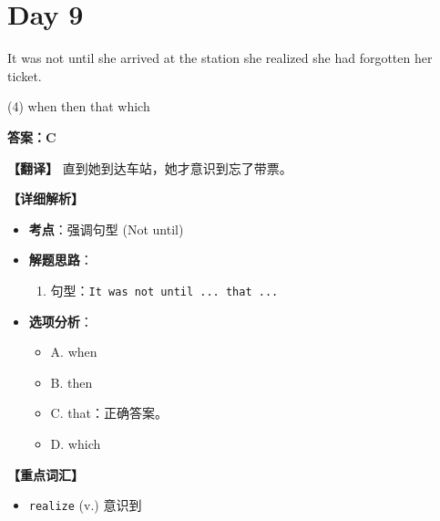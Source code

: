 \documentclass[11pt, a4paper]{article}
\newcommand{\analysis}[4]{
    \begin{solutionbox}
        \textbf{答案：#1}
        
        \textbf{【翻译】} #2
        
        \textbf{【详细解析】}
        #3
        
        \textbf{【重点词汇】}
        #4
    \end{solutionbox}
}
\newcommand{\blank}{\underline{\hspace{1.5cm}}}
\begin{document}
\section*{Day 9}
\begin{questions}
    \item It was not until she arrived at the station \blank she realized she had forgotten her ticket.
    \begin{tasks}(4)
        \task when \task then \task that \task which
    \end{tasks}
    \analysis{C}{直到她到达车站，她才意识到忘了带票。}{
        \begin{itemize}
            \item \textbf{考点}：强调句型 (Not until)
            \item \textbf{解题思路}：
                \begin{enumerate}
                    \item 句型：\texttt{It was not until ... that ...}
                \end{enumerate}
            \item \textbf{选项分析}：
                \begin{itemize}
                    \item A. when
                    \item B. then
                    \item C. that：正确答案。
                    \item D. which
                \end{itemize}
        \end{itemize}
    }{
        \begin{itemize}
            \item \texttt{realize} (v.) 意识到
        \end{itemize}
    }


\end{questions}
\end{document}
